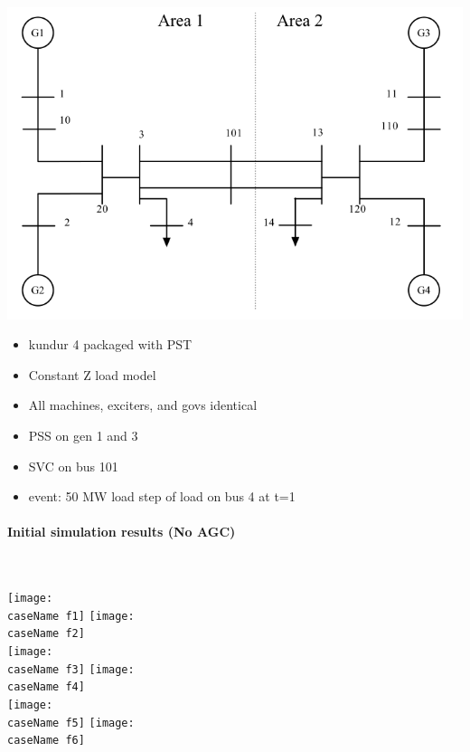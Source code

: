 \documentclass[12pt]{article}
\begin{document}
\begin{center}
\includegraphics[width=.75\linewidth]{sysOneLineAreas}
\end{center}
\begin{itemize}
\item kundur  4 packaged with PST
\item Constant Z load model
\item All machines, exciters, and govs identical
\item PSS on gen 1 and 3
\item SVC on bus 101
\item event: 50 MW load step of load on bus 4 at t=1
\end{itemize}

\pagebreak
\paragraph{Initial simulation results (No AGC)} \ \\


\begin{center}
\newcommand{\caseName}{NoAGC}
\texttt{[image: \\caseName f1]} %
\texttt{[image: \\caseName f2]} \\%
\texttt{[image: \\caseName f3]} %
\texttt{[image: \\caseName f4]} \\%
\texttt{[image: \\caseName f5]} %
\texttt{[image: \\caseName f6]} \\%
\end{center}

\end{document}
